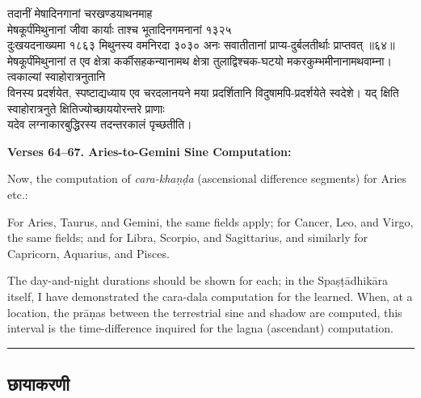 \documentclass[11pt,a4paper]{article}
\newcommand{\longline}{\noindent\rule{\textwidth}{0.4pt}}
\newcommand{\dev}[1]{{\devanagarifont #1}}
\newcommand{\sectsep}{\par\vspace{0.8em}\longline\vspace{0.8em}}
\begin{document}
\begin{minipage}[t]{0.48\textwidth}
\small\devanagarifont
तदानीं मेषादिनगानां चरखण्डयाथनमाह\\
मेषकूर्पंमिथुनानां जीवा कार्याः ताश्च भूतादिनगमनानां १३२५\\
दुःखयदनाख्यमा १८६३ मिथुनस्य वमनिरदा ३०३० अनः सवातीतानां प्राप्य-दुर्बलतीर्थाः प्राप्तवत् ॥६४॥\\[0.5em]
मेषकूर्पंमिथुनानां त एव क्षेत्रा कर्कीसहकन्यानामथ क्षेत्रा तुलाद्विश्चक-घटयो मकरकुम्भमीनानामथवाम्ना। त्वकाल्यां स्वाहोरात्रनुतानि\\
विनस्य प्रदर्शयेत, स्पष्टाद्यध्याय एव चरदलानयने मया प्रदर्शितानि विदुषामपि-प्रदर्शयेते स्वदेशे। यद् क्षिति स्वाहोरात्रनुते क्षितिज्योच्छाययोरन्तरे प्राणाः\\
यदेव लग्नाकारबुद्धिरस्य तदन्तरकालं पृच्छतीति।
\end{minipage}%
\hfill
\begin{minipage}[t]{0.48\textwidth}
\small
\textbf{Verses 64--67. Aries-to-Gemini Sine Computation:}

Now, the computation of \textit{cara-kha\d{n}\d{d}a} (ascensional difference segments) for Aries etc.:

For Aries, Taurus, and Gemini, the same fields apply; for Cancer, Leo, and Virgo, the same fields; and for Libra, Scorpio, and Sagittarius, and similarly for Capricorn, Aquarius, and Pisces.

The day-and-night durations should be shown for each; in the Spa\d{s}\d{t}\=adhik\=ara itself, I have demonstrated the cara-dala computation for the learned. When, at a location, the pr\=a\d{n}as between the terrestrial sine and shadow are computed, this interval is the time-difference inquired for the lagna (ascendant) computation.
\end{minipage}

\sectsep

\subsection{\dev{छायाकरणी}}
\end{document}
